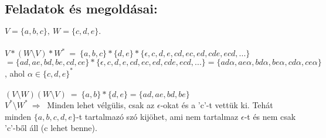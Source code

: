 \documentclass[12pt]{article}
\begin{document}
\subsection{Feladatok és megoldásai: \\}
$ V=\{ a,b,c \}, \ W=\{ c,d,e \} .$ \\\\
$ V*(W \setminus V)*W^* \ =\ \{a,b,c\}*\{d,e\}*\{\epsilon, c, d, e, cd, ec, ed, cde, ecd, ...\} $ \\
$= \{ad, ae, bd, be, cd, ce\}*\{\epsilon, c, d, e, cd, ec, ed, cde, ecd, ...\} = \{ ad\alpha,
ae\alpha, bd\alpha, be\alpha, cd\alpha, ce\alpha \} $, ahol $\alpha \in \{c,d,e \}^{*}$ \\\\
$ (V \setminus W)(W \setminus V) \ =\ \{a,b\}*\{d,e\} = \{ ad, ae, bd, be \} $ \\
$ V^* \setminus W^*\ \Longrightarrow \ $ Minden lehet vélgülis, csak az $\epsilon$-okat
és a 'c'-t vettük ki. Tehát minden $\{ a,b,c,d,e \} $-t tartalmazó szó kijöhet, ami nem tartalmaz
$\epsilon$-t és nem csak 'c'-ből áll (c lehet benne).
\end{document}
